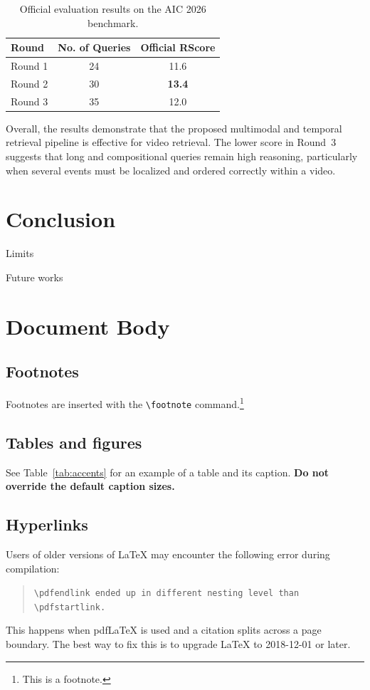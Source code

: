 \documentclass[11pt]{article}
\begin{document}
\begin{table}[t]
\centering
\caption{Official evaluation results on the AIC 2026 benchmark.}
\label{tab:experiment-results}
\small
\begin{tabular}{lcc}
\hline
\textbf{Round} & \textbf{No. of Queries} & \textbf{Official RScore} \\
\hline
Round 1 & 24 & 11.6 \\
Round 2 & 30 & \textbf{13.4} \\
Round 3 & 35 & 12.0 \\
\hline
\end{tabular}
\end{table}

Overall, the results demonstrate that the proposed multimodal and temporal retrieval pipeline is effective for video retrieval. The lower score in Round~3 suggests that long and compositional queries remain high reasoning, particularly when several events must be localized and ordered correctly within a video.

\section{Conclusion}


Limits


Future works


\section{Document Body}

\subsection{Footnotes}

Footnotes are inserted with the \verb|\footnote| command.\footnote{This is a footnote.}

\subsection{Tables and figures}

See Table~\ref{tab:accents} for an example of a table and its caption.
\textbf{Do not override the default caption sizes.}

\subsection{Hyperlinks}

Users of older versions of \LaTeX{} may encounter the following error during compilation: 
\begin{quote}
\tt\verb|\pdfendlink| ended up in different nesting level than \verb|\pdfstartlink|.
\end{quote}
This happens when pdf\LaTeX{} is used and a citation splits across a page boundary. The best way to fix this is to upgrade \LaTeX{} to 2018-12-01 or later.
\end{document}
